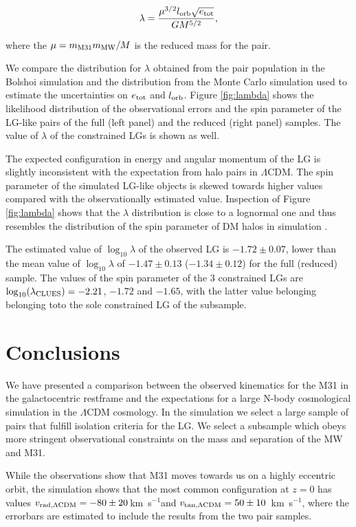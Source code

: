 \documentclass{emulateapj}
\newcommand{\kms}{\,km~s$^{-1}$}
\begin{document}
\begin{equation}
\lambda = \frac{\mu^{3/2} l_{\rm orb} \sqrt{e_{\rm tot}}}{G M^{5/2}}, 
\end{equation}

where the $\mu=m_{\rm M31}m_{\rm MW}/M$ is the reduced mass for the pair.


We compare the distribution for  $\lambda$ obtained from the pair
population in the Bolshoi simulation and the distribution from the  Monte Carlo
simulation used to estimate the uncertainties on $e_{\rm tot}$ and $l_{\rm orb}$. 
Figure \ref{fig:lambda} shows the likelihood distribution of the
observational errors and the spin parameter of the LG-like pairs of
the full (left panel) and the reduced (right panel) samples.  The value
of $\lambda$ of the constrained LGs is shown as well.  

The expected configuration in energy and angular momentum of the LG is
slightly inconsistent with the expectation from halo pairs in $\Lambda$CDM. The spin parameter of the simulated LG-like objects is skewed towards higher values compared with the observationally estimated value. 
Inspection of Figure \ref{fig:lambda} shows that the $\lambda$
distribution is close to a lognormal one and thus resembles the
distribution of the spin parameter of DM halos in simulation
\citep{Bett2007}. 

The estimated value of $\log_{10}\lambda$ of the
observed LG is $-1.72\pm 0.07$, lower than the mean value of
$\log_{10}\lambda$ of $-1.47\pm0.13$ ($-1.34\pm 0.12$) for the full
(reduced) sample. The values of the spin parameter of the 3
constrained LGs are $\log_{10}(\lambda_{\rm  CLUES})=-2.21$, $-1.72$
and $-1.65$, with the latter value belonging belonging toto the sole constrained LG
of the subsample.   

\section{Conclusions}
We have presented a comparison between the observed kinematics for the
M31 in the galactocentric restframe and the expectations for a large
N-body cosmological simulation in the $\Lambda$CDM cosmology. In the
simulation we select a large sample of pairs that fulfill isolation
criteria for the LG. We select a subsample which obeys more
stringent observational constraints on the mass and separation of the
MW and M31.

While the observations show that M31 moves towards us  on a highly eccentric orbit,
 the simulation shows that the most common configuration at $z=0$ has
 values $v_{\rm rad, \Lambda CDM}=-80\pm20$\kms and $v_{\rm tan,
   \Lambda CDM}=50\pm10$ \kms, where the errorbars are estimated to
 include the results from the two pair samples.
\end{document}
